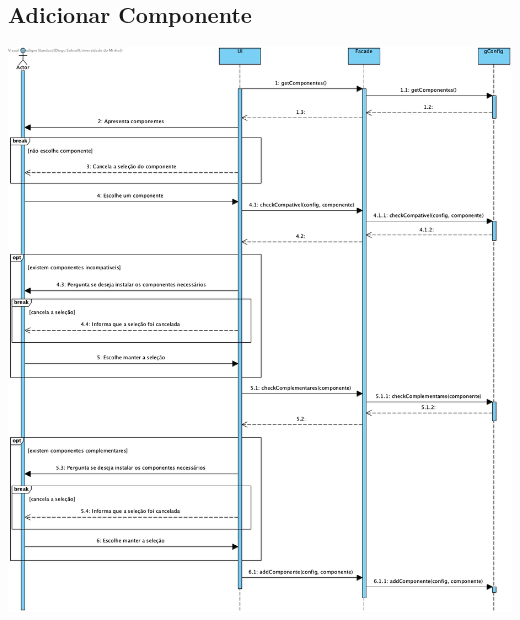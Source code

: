 \subsection{Adicionar Componente}
\begin{center}
 	\includegraphics[width = 5.5in]{DSSS/DSSS-Adicionar_Componente.jpg}
\end{center}


